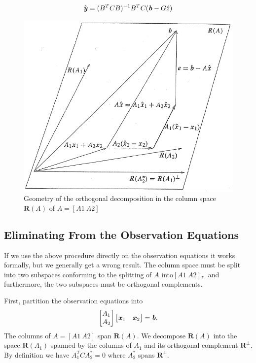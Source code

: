 \begin{align}
\hat{\textbf{\textit{y}}} = (B^{T}CB)^{-1}B^{T}C(\textbf{\textit{b}} - G\hat{z} )
\end{align}
\begin{figure}[htb]
	\centering
	\includegraphics[width=0.7\linewidth]{TeX_files/Part02/chapter06/image/6-3}
	\caption{Geometry of the orthogonal decomposition in the column space $\textbf{R}(A)$ of $A=[A1 \ A2]$ }
\end{figure}


\subsection{Eliminating From the Observation Equations}

\begin{flushleft}
	If we use the above procedure directly on the observation equations it works formally, but we generally get a wrong result. The column space must be split into two subspaces conforming to the splitting of $A$ into$[A1 \ A2]$，and furthermore, the two subspaces must be orthogonal complements.
\end{flushleft}

First, partition the observation equations into
\begin{align}
\begin{bmatrix}
A_{1}\\
A_{2}
\end{bmatrix}
\begin{bmatrix}
\textbf{\textit{x}}_{1} & \textbf{\textit{x}}_{2}
\end{bmatrix} = \textbf{\textit{b}}.
\end{align}
The columns of $A = [A1 \ A2]$ span $\textbf{R}(A)$. We decompose $\textbf{R}(A)$ into the space $\textbf{R}(A_{1})$ spanned by the columns of $A_{1}$ and its orthogonal complement $\textbf{R}^{\bot} $. By definition we have $ A^{T}_{1}CA^{*}_{2} = 0 $ where $ A^{*}_{2}$ spans $\textbf{R}^{\bot} $.

